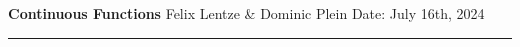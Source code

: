 \documentclass[10pt,a4paper,usenglish]{article}
\newcommand{\subject}{Continuous Functions}
\newcommand{\authors}{Felix Lentze \& Dominic Plein}
\newcommand{\experimentdate}{July 16th, 2024}
\begin{document}
\setlength{\abovedisplayskip}{0.2em}

\thispagestyle{plain} %

\vspace*{-2cm}

\begin{FlushLeft}
    \LARGE \textbf{\subject} \vspace{1mm}\linebreak
    \normalsize	\authors \vspace{1mm}\linebreak
    \small Date: \experimentdate

    \textcolor{heidelberg-red}{\rule{\linewidth}{1mm}}
\end{FlushLeft}

\tableofcontents
\pagebreak

\pagebreak

\pagebreak

\pagebreak

\end{document}
